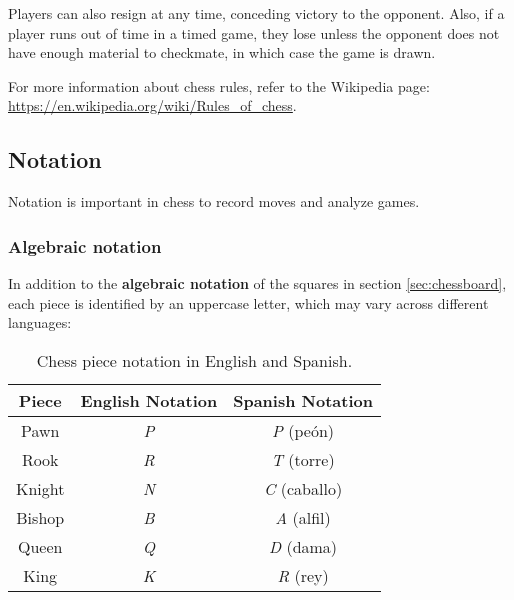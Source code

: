 Players can also resign at any time, conceding victory to the opponent. Also, if a player runs out of time in a timed game, they lose unless the opponent does not have enough material to checkmate, in which case the game is drawn.

\vspace{1em}

For more information about chess rules, refer to the Wikipedia page: \url{https://en.wikipedia.org/wiki/Rules_of_chess}.

\subsection{Notation}

Notation is important in chess to record moves and analyze games.

\subsubsection{Algebraic notation}

In addition to the \textbf{algebraic notation} of the squares in section \ref{sec:chessboard}, each piece is identified by an uppercase letter, which may vary across different languages:

\begin{table}[H]
    \centering
    \begin{tabular}{|c|c|c|}
        \hline
        \textbf{Piece} & \textbf{English Notation} & \textbf{Spanish Notation} \\ \hline
        Pawn           & \textit{P}               & \textit{P} (peón)         \\ \hline
        Rook           & \textit{R}               & \textit{T} (torre)        \\ \hline
        Knight         & \textit{N}               & \textit{C} (caballo)      \\ \hline
        Bishop         & \textit{B}               & \textit{A} (alfil)        \\ \hline
        Queen          & \textit{Q}               & \textit{D} (dama)         \\ \hline
        King           & \textit{K}               & \textit{R} (rey)          \\ \hline
    \end{tabular}
    \caption{Chess piece notation in English and Spanish.}
    \label{tab:chess-notation}
\end{table}

